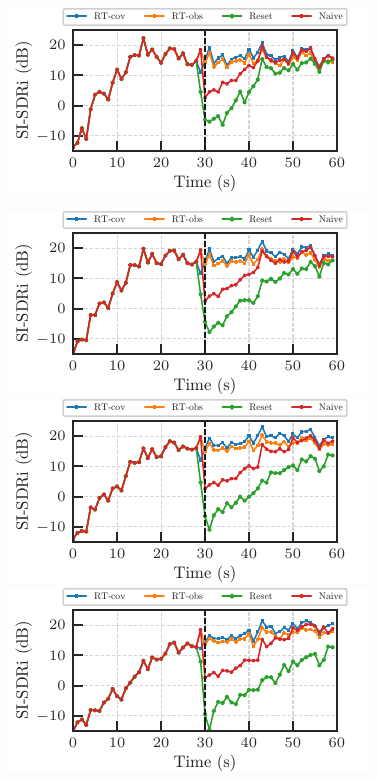 \documentclass[sip,biber]{now-journal}
\begin{document}
\begin{figure}[t]
\begin{minipage}[t]{.5\linewidth}
    \centering\includegraphics{figures/plots/online/Gauss_8000_fft4096_94.pdf}\label{fig:plot:gauss:94}
  \end{minipage}%
  \begin{minipage}[t]{.5\linewidth}
    \centering\includegraphics{figures/plots/online/Gauss_8000_fft4096_95.pdf}\label{fig:plot:gauss:95}
    \centering\includegraphics{figures/plots/online/Gauss_8000_fft4096_96.pdf}\label{fig:plot:gauss:96}
    \centering\includegraphics{figures/plots/online/Gauss_8000_fft4096_97.pdf}\label{fig:plot:gauss:97}

\end{minipage}
\end{figure}
\end{document}
